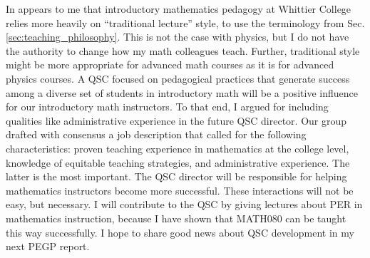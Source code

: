 \documentclass[../../../main.tex]{subfiles}
\begin{document}
In appears to me that introductory mathematics pedagogy at Whittier College relies more heavily on ``traditional lecture'' style, to use the terminology from Sec. \ref{sec:teaching_philosophy}.  This is not the case with physics, but I do not have the authority to change how my math colleagues teach.  Further, traditional style might be more appropriate for advanced math courses as it is for advanced physics courses.  A QSC focused on pedagogical practices that generate success among a diverse set of students in introductory math will be a positive influence for our introductory math instructors.  To that end, I argued for including qualities like administrative experience in the future QSC director.  Our group drafted with consensus a job description that called for the following characteristics: proven teaching experience in mathematics at the college level, knowledge of equitable teaching strategies, and administrative experience.  The latter is the most important.  The QSC director will be responsible for helping mathematics instructors become more successful.  These interactions will not be easy, but necessary.  I will contribute to the QSC by giving lectures about PER in mathematics instruction, because I have shown that MATH080 can be taught this way successfully.  I hope to share good news about QSC development in my next PEGP report.
\end{document}
